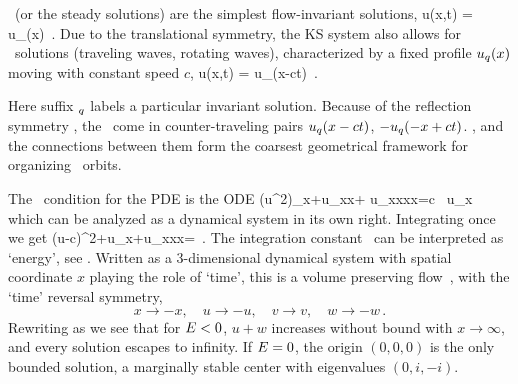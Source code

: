 \Eqva\  (or the steady solutions)
are the simplest flow-invariant solutions,
\beq
 u(x,t) = u_\stagn(x) %
\,.
Due to the translational symmetry,
the KS system also allows for \reqv\ solutions
(traveling waves, rotating waves),
characterized by a fixed profile $u_\stagn(x)$
moving with constant speed $c$, {\ie}
\beq
 u(x,t) =  u_\stagn(x-ct) %
\,.

Here suffix ${}_\stagn$ labels a particular invariant solution.
Because of the reflection symmetry ,
the \reqva\ come in counter-traveling pairs
$u_\stagn(x-ct)$, $-u_\stagn(-x+ct)$. %
\Eqva, and the connections between them form the coarsest
geometrical framework for organizing
\statesp\ orbits. %


The \reqv\ condition for the {\KS} PDE 
is the ODE
\beq
{\textstyle{}}(u^2)_x+u_{xx}+ u_{xxxx}=c \, u_x
which can be analyzed as a dynamical system in its own right.
Integrating once we get
\beq
{\textstyle{}}(u-c)^2+u_x+u_{xxx}=\expctE
\,.
\label{eq:stdks}
\eeq
The integration constant \expctE\ can be interpreted as `energy',
see .
Written as a 3-dimen\-si\-on\-al dynamical system
with spatial coordinate $x$ playing the role of `time',
this is a volume preserving flow
\beq
{}
\,,
  \label{eq:3dks}
\eeq
with the `time' reversal symmetry,
\[
x \to -x,\quad u \to -u, \quad v \to v, \quad w \to -w \,.
\]
 Rewriting  as
\beq
{}
we see that
for $E<0$, $u+w$ increases without bound with $x \to \infty$,
and every solution escapes to infinity.
If $E=0$, the origin $(0,0,0)$ is the
only bounded  solution, a marginally stable center with
eigenvalues $(0, i,-i)$.

